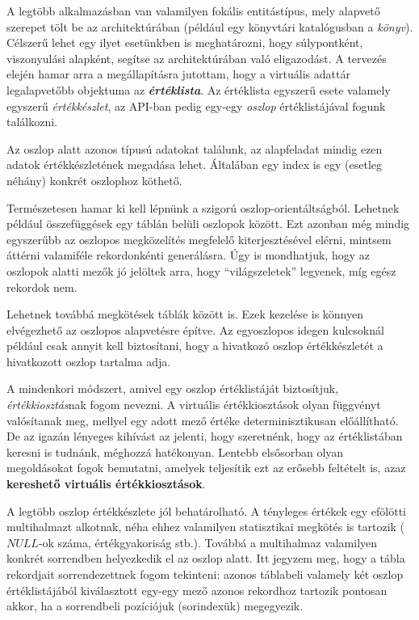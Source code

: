 \documentclass[
    parspace,
    noindent,
    nohyp,
]{elteiktdk}[2023/04/10]
\begin{document}
A legtöbb alkalmazásban van valamilyen fokális entitástípus,
mely alapvető szerepet tölt be az architektúrában
(például egy könyvtári katalógusban a \textit{könyv}).
Célszerű lehet egy ilyet esetünkben is meghatározni,
hogy súlypontként, viszonyulási alapként, segítse az architektúrában való eligazodást.
A tervezés elején hamar arra a megállapításra jutottam,
hogy a virtuális adattár legalapvetőbb objektuma az \textbf{\textit{értéklista}}.
Az értéklista egyszerű esete valamely egyszerű \textit{értékkészlet},
az API-ban pedig egy-egy \textit{oszlop} értéklistájával fogunk találkozni.

Az oszlop alatt azonos típusú adatokat találunk,
az alapfeladat mindig ezen adatok értékkészletének megadása lehet.
Általában egy index is egy (esetleg néhány) konkrét oszlophoz köthető.

Természetesen hamar ki kell lépnünk a szigorú oszlop-orientáltságból.
Lehetnek például összefüggések egy táblán belüli oszlopok között.
Ezt azonban még mindig egyszerűbb az oszlopos megközelítés megfelelő kiterjesztésével elérni,
mintsem áttérni valamiféle rekordonkénti generálásra.
Úgy is mondhatjuk, hogy az oszlopok alatti mezők jó jelöltek arra, hogy ``világszeletek'' legyenek,
míg egész rekordok nem.

Lehetnek továbbá megkötések táblák között is.
Ezek kezelése is könnyen elvégezhető az oszlopos alapvetésre építve.
Az egyoszlopos idegen kulcsoknál például csak annyit kell biztosítani,
hogy a hivatkozó oszlop értékkészletét a hivatkozott oszlop tartalma adja.

A mindenkori módszert, amivel egy oszlop értéklistáját biztosítjuk,
\textit{értékkiosztás}nak fogom nevezni.
A virtuális értékkiosztások olyan függvényt valósítanak meg,
mellyel egy adott mező értéke determinisztikusan előállítható.
De az igazán lényeges kihívást az jelenti, hogy szeretnénk,
hogy az értéklistában keresni is tudnánk, méghozzá hatékonyan.
Lentebb elsősorban olyan megoldásokat fogok bemutatni,
amelyek teljesítik ezt az erősebb feltételt is,
azaz \textbf{kereshető virtuális értékkiosztások}.

A legtöbb oszlop értékkészlete jól behatárolható.
A tényleges értékek egy efölötti multihalmazt alkotnak,
néha ehhez valamilyen statisztikai megkötés is tartozik ($NULL$-ok száma, értékgyakoriság stb.).
Továbbá a multihalmaz valamilyen konkrét sorrendben helyezkedik el az oszlop alatt.
Itt jegyzem meg, hogy a tábla rekordjait sorrendezettnek fogom tekinteni:
azonos táblabeli valamely két oszlop értéklistájából kiválasztott egy-egy mező
azonos rekordhoz tartozik pontosan akkor, ha a sorrendbeli pozíciójuk (sorindexük) megegyezik.
\end{document}
